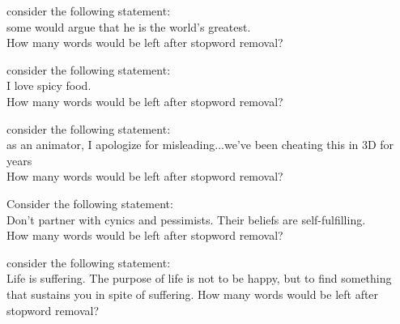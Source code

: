 \documentclass[theme=sleek, randomorder, hidesidemenu]{webquiz}
\begin{document}
\begin{question}
  consider the following statement:\\ some would argue that he is the world's greatest.\\
  How many words would be left after stopword removal?
  \begin{choice}[columns=2]
  \end{choice}
\end{question}

\begin{question}
  consider the following statement:\\
  I love spicy food.\\
  How many words would be left after stopword removal?
  \begin{choice}[columns=2]
  \end{choice}
\end{question}

\begin{question}
  consider the following statement:\\
as an animator, I apologize for misleading...we've been cheating this in 3D for years \\
  How many words would be left after stopword removal?
\end{question}

\begin{question}
  Consider the following statement:\\
  Don’t partner with cynics and pessimists. Their beliefs are self-fulfilling.\\
  How many words would be left after stopword removal?
  \begin{choice}[columns=2]
  \end{choice}
\end{question}

\begin{question}
  consider the following statement:\\
Life is suffering. The purpose of life is not to be happy, but to find something that sustains you in spite of suffering.
  How many words would be left after stopword removal?
\end{question}
\end{document}
